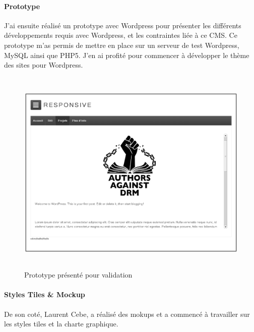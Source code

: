 \documentclass[11pt,a4paper]{report}
\begin{document}
			\paragraph*{Prototype}J'ai ensuite réalisé un prototype avec Wordpress pour présenter les différents développements requis avec Wordpress, et les contraintes liée à ce CMS. Ce prototype m'as permis de mettre en place sur un serveur de test Wordpress, MySQL ainsi que PHP5. J'en ai profité pour commencer à développer le thème des sites pour Wordpress.

				\begin{figure}[H]
					\centering
					\includegraphics[height=10cm]{Prototype.eps}
					\caption{Prototype présenté pour validation}
					\label{fig:Prototype}
				\end{figure}

			\paragraph*{Styles Tiles \& Mockup}De son coté, Laurent Cebe, a réalisé des mokups et a commencé à travailler sur les styles tiles et la charte graphique.
\end{document}
